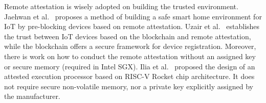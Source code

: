 Remote attestation is wisely adopted on building the trusted environment. Jaehwan et al.~\cite{AhnLK20} proposes a method
of building a safe smart home environment for IoT by pre-blocking devices based on remote attestation. 
Uzair et al.~\cite{JavaidAS20} establishes the trust between IoT devices based on the blockchain and remote attestation, while the blockchain offers a secure framework for device registration. Moreover, there is work on how to conduct the remote attestation without an assigned key or secure memory (required in Intel SGX). Ilia et al.~\cite{LebedevHD18} proposed the design of an attested execution processor based on RISC-V Rocket chip architecture. It does not 
require secure non-volatile memory, nor a private key explicitly assigned by the manufacturer.